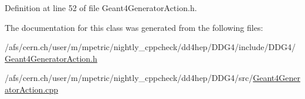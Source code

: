 Definition at line 52 of file Geant4GeneratorAction.h.

The documentation for this class was generated from the following files:\begin{DoxyCompactItemize}
\item 
/afs/cern.ch/user/m/mpetric/nightly\_\-cppcheck/dd4hep/DDG4/include/DDG4/\hyperlink{_geant4_generator_action_8h}{Geant4GeneratorAction.h}\item 
/afs/cern.ch/user/m/mpetric/nightly\_\-cppcheck/dd4hep/DDG4/src/\hyperlink{_geant4_generator_action_8cpp}{Geant4GeneratorAction.cpp}\end{DoxyCompactItemize}
